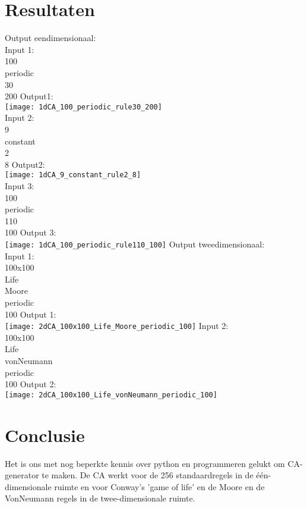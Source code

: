 \documentclass[12pt,a4paper]{article}
\begin{document}
\section*{Resultaten}
Output eendimensionaal: \\
Input 1: \\
100 \\
periodic \\
30 \\
200
\newline Output1: \\
\texttt{[image: 1dCA\_100\_periodic\_rule30\_200]} \\
\newpage
Input 2: \\
9 \\
constant \\
2 \\
8
\newline Output2: \\
\texttt{[image: 1dCA\_9\_constant\_rule2\_8]} \\
Input 3: \\
100 \\
periodic \\
110 \\
100
\newline Output 3: \\
\texttt{[image: 1dCA\_100\_periodic\_rule110\_100]}
\newpage
Output tweedimensionaal: \\
Input 1: \\
100x100 \\
Life \\
Moore \\
periodic \\
100
\newline Output 1: \\
\texttt{[image: 2dCA\_100x100\_Life\_Moore\_periodic\_100]}
\newpage
Input 2: \\
100x100 \\
Life \\
vonNeumann \\
periodic \\
100
\newline Output 2: \\
\texttt{[image: 2dCA\_100x100\_Life\_vonNeumann\_periodic\_100]}



\section*{Conclusie}
Het is ons met nog beperkte kennis over python en programmeren gelukt om CA-generator te maken. De CA werkt voor de 256 standaardregels in de één-dimensionale ruimte en voor Conway's 'game of life' en de Moore en de VonNeumann regels in de twee-dimensionale ruimte.
\end{document}
